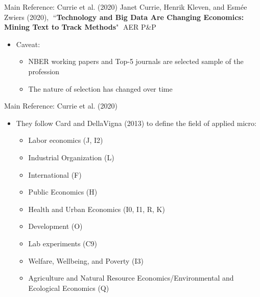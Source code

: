 \documentclass[dvipsnames,hyperref={pdfpagelabels=false}]{beamer}
\begin{document}
\begin{frame}{Main Reference: Currie et al. (2020)}
	Janet Currie, Henrik Kleven, and Esmée Zwiers (2020), ``\textbf{Technology and Big Data Are Changing Economics: Mining Text to Track Methods}" AER P\&P
	\vspace{0.2cm}	
	\begin{itemize}
		\item Caveat: 
		\vspace{0.2cm}	
		\begin{itemize}
			\item NBER working papers and Top-5 journals are selected sample of the profession
			\vspace{0.2cm}	
			\item The nature of selection has changed over time
		\end{itemize}
	\end{itemize}
\end{frame}


\begin{frame}{Main Reference: Currie et al. (2020)}
	
	\begin{itemize}
		\item They follow Card and DellaVigna (2013) to define the field of applied micro: 
		\vspace{0.2cm}	
		\begin{itemize}
			\item  Labor economics (J, I2)
			\vspace{0.2cm}	
			\item Industrial Organization (L)
			\vspace{0.2cm}	
			\item International (F)
			\vspace{0.2cm}	
			\item Public Economics (H)
			\vspace{0.2cm}	
			\item Health and Urban Economics (I0, I1, R, K)
			\vspace{0.2cm}	
			\item Development (O)
			\vspace{0.2cm}	
			\item Lab experiments (C9)
			\vspace{0.2cm}	
			\vspace{0.2cm}	
			\item  Welfare, Wellbeing, and Poverty (I3)	
			\vspace{0.2cm}	
			\item  Agriculture and Natural Resource Economics/Environmental and Ecological
			Economics (Q)
			
		\end{itemize}
	\end{itemize}
\end{frame}
\end{document}
